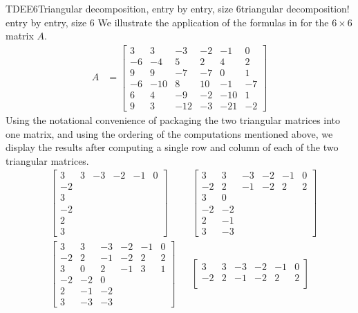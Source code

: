 \begin{example}{TDEE6}{Triangular decomposition, entry by entry, size 6}{triangular decomposition! entry by entry, size 6}
%
We illustrate the application of the formulas in  for the $6\times 6$ matrix $A$.  
%
\begin{align*}
A&=
\begin{bmatrix}
 3 & 3 & -3 & -2 & -1 & 0 \\
 -6 & -4 & 5 & 2 & 4 & 2 \\
 9 & 9 & -7 & -7 & 0 & 1 \\
 -6 & -10 & 8 & 10 & -1 & -7 \\
 6 & 4 & -9 & -2 & -10 & 1 \\
 9 & 3 & -12 & -3 & -21 & -2
\end{bmatrix}
\end{align*}
%
Using the notational convenience of packaging the two triangular matrices into one matrix, and using the ordering of the computations mentioned above, we display the results after computing a single row and column of each of the two triangular matrices.
%
\begin{align*}
%
&
\begin{bmatrix}
3&3&-3&-2&-1&0\\
 -2  \\
 3  \\
 -2  \\
 2  \\
 3
\end{bmatrix}
%
&&
\begin{bmatrix}
 3 & 3 & -3 & -2 & -1 & 0 \\
 -2 & 2 & -1 & -2 & 2 & 2 \\
 3 & 0  \\
 -2 & -2  \\
 2 & -1  \\
 3 & -3 
\end{bmatrix}\\
&
\begin{bmatrix}
 3 & 3 & -3 & -2 & -1 & 0 \\
 -2 & 2 & -1 & -2 & 2 & 2 \\
 3 & 0 & 2 & -1 & 3 & 1 \\
 -2 & -2 & 0  \\
 2 & -1 & -2  \\
 3 & -3 & -3 
\end{bmatrix}
%
&&
\begin{bmatrix}
 3 & 3 & -3 & -2 & -1 & 0 \\
 -2 & 2 & -1 & -2 & 2 & 2 \\

\end{bmatrix}
\end{align*}
\end{example}
